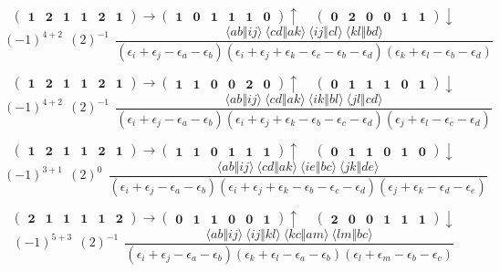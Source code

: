 \documentclass[12pt,oneside,a4paper,fleqn]{article}
\begin{document}
\[ \boldsymbol{ \begin{pmatrix} 1 & 2 & 1 & 1 & 2 & 1 \end{pmatrix} \rightarrow \begin{pmatrix} 1 & 0 & 1 & 1 & 1 & 0 \end{pmatrix} \uparrow~~~~~\begin{pmatrix} 0 & 2 & 0 & 0 & 1 & 1 \end{pmatrix} \downarrow } \]
$$(-1)^{4+2}~~(2)^{-1}~~\frac{\langle ab \Vert ij \rangle ~\langle cd \Vert ak \rangle ~\langle ij \Vert cl \rangle ~\langle kl \Vert bd \rangle }{(\epsilon_i +\epsilon_j -\epsilon_a -\epsilon_b ) (\epsilon_i +\epsilon_j +\epsilon_k -\epsilon_c -\epsilon_b -\epsilon_d ) (\epsilon_k +\epsilon_l -\epsilon_b -\epsilon_d ) }$$

\[ \boldsymbol{ \begin{pmatrix} 1 & 2 & 1 & 1 & 2 & 1 \end{pmatrix} \rightarrow \begin{pmatrix} 1 & 1 & 0 & 0 & 2 & 0 \end{pmatrix} \uparrow~~~~~\begin{pmatrix} 0 & 1 & 1 & 1 & 0 & 1 \end{pmatrix} \downarrow } \]
$$(-1)^{4+2}~~(2)^{-1}~~\frac{\langle ab \Vert ij \rangle ~\langle cd \Vert ak \rangle ~\langle ik \Vert bl \rangle ~\langle jl \Vert cd \rangle }{(\epsilon_i +\epsilon_j -\epsilon_a -\epsilon_b ) (\epsilon_i +\epsilon_j +\epsilon_k -\epsilon_b -\epsilon_c -\epsilon_d ) (\epsilon_j +\epsilon_l -\epsilon_c -\epsilon_d ) }$$

\[ \boldsymbol{ \begin{pmatrix} 1 & 2 & 1 & 1 & 2 & 1 \end{pmatrix} \rightarrow \begin{pmatrix} 1 & 1 & 0 & 1 & 1 & 1 \end{pmatrix} \uparrow~~~~~\begin{pmatrix} 0 & 1 & 1 & 0 & 1 & 0 \end{pmatrix} \downarrow } \]
$$(-1)^{3+1}~~(2)^{0}~~\frac{\langle ab \Vert ij \rangle ~\langle cd \Vert ak \rangle ~\langle ie \Vert bc \rangle ~\langle jk \Vert de \rangle }{(\epsilon_i +\epsilon_j -\epsilon_a -\epsilon_b ) (\epsilon_i +\epsilon_j +\epsilon_k -\epsilon_b -\epsilon_c -\epsilon_d ) (\epsilon_j +\epsilon_k -\epsilon_d -\epsilon_e ) }$$

\[ \boldsymbol{ \begin{pmatrix} 2 & 1 & 1 & 1 & 1 & 2 \end{pmatrix} \rightarrow \begin{pmatrix} 0 & 1 & 1 & 0 & 0 & 1 \end{pmatrix} \uparrow~~~~~\begin{pmatrix} 2 & 0 & 0 & 1 & 1 & 1 \end{pmatrix} \downarrow } \]
$$(-1)^{5+3}~~(2)^{-1}~~\frac{\langle ab \Vert ij \rangle ~\langle ij \Vert kl \rangle ~\langle kc \Vert am \rangle ~\langle lm \Vert bc \rangle }{(\epsilon_i +\epsilon_j -\epsilon_a -\epsilon_b ) (\epsilon_k +\epsilon_l -\epsilon_a -\epsilon_b ) (\epsilon_l +\epsilon_m -\epsilon_b -\epsilon_c ) }$$
\end{document}
